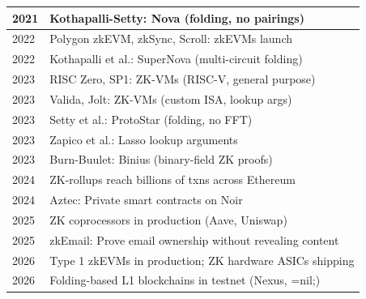 \begin{tabularx}{\linewidth}{|l|X|}
\hline
2021 & Kothapalli-Setty: Nova (folding, no pairings) \\
\hline
2022 & Polygon zkEVM, zkSync, Scroll: zkEVMs launch \\
\hline
2022 & Kothapalli et al.: SuperNova (multi-circuit folding) \\
\hline
2023 & RISC Zero, SP1: ZK-VMs (RISC-V, general purpose) \\
\hline
2023 & Valida, Jolt: ZK-VMs (custom ISA, lookup args) \\
\hline
2023 & Setty et al.: ProtoStar (folding, no FFT) \\
\hline
2023 & Zapico et al.: Lasso lookup arguments \\
\hline
2023 & Burn-Buulet: Binius (binary-field ZK proofs) \\
\hline
2024 & ZK-rollups reach billions of txns across Ethereum \\
\hline
2024 & Aztec: Private smart contracts on Noir \\
\hline
2025 & ZK coprocessors in production (Aave, Uniswap) \\
\hline
2025 & zkEmail: Prove email ownership without revealing content \\
\hline
2026 & Type 1 zkEVMs in production; ZK hardware ASICs shipping \\
\hline
2026 & Folding-based L1 blockchains in testnet (Nexus, =nil;) \\
\hline
\end{tabularx}


